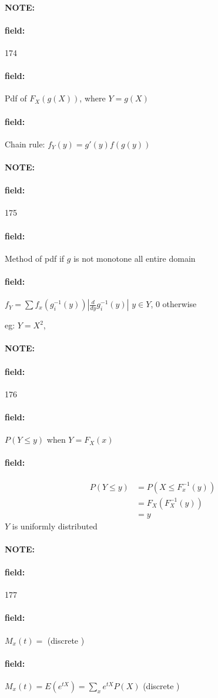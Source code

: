 \documentclass[12pt]{article}
\newenvironment{note}{\paragraph{NOTE:}}{}
\newenvironment{field}{\paragraph{field:}}{}
\begin{document}
\begin{note} \begin{field} \tiny 174 \end{field}
  \begin{field}
    Pdf of $F_X(g(X))$, where $Y = g(X)$
  \end{field}
  \begin{field}
    Chain rule:
    $f_Y(y) = g'(y)f(g(y))$
  \end{field}
\end{note}

\begin{note} \begin{field} \tiny 175 \end{field}
  \begin{field}
    Method of pdf if $g$ is not monotone all entire domain
  \end{field}
  \begin{field}
    $f_Y = \sum f_x(g_i^{-1}(y))|\frac{d}{dy}g_i^{-1}(y)|$ $y \in Y$, 0 otherwise

    eg: $Y = X^2$,
  \end{field}
\end{note}

\begin{note} \begin{field} \tiny 176 \end{field}
  \begin{field}
    $P(Y  \leq y)$ when $Y = F_X(x)$
  \end{field}
  \begin{field}
    \begin{align*}
      P(Y \leq y) &= P(X \leq F_x^{-1}(y))\\
      &= F_X(F_X^{-1}(y))\\
      &= y
    \end{align*}
    $Y$ is uniformly distributed
  \end{field}
\end{note}

\begin{note} \begin{field} \tiny 177 \end{field}
  \begin{field}
    $M_x(t) = $ (discrete )
  \end{field}
  \begin{field}
    $M_x(t) = E(e^{tX}) = \sum_x e^{tX}P(X)$ (discrete )
  \end{field}
\end{note}
\end{document}

